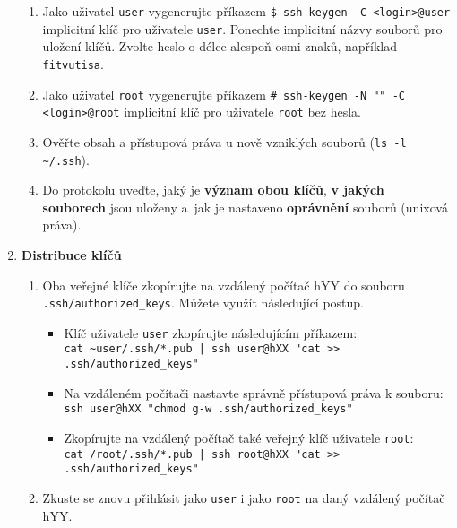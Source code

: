 \documentclass[a4paper,11pt]{article}
\begin{document}
\begin{enumerate}
    \begin{enumerate}

      \item Jako uživatel {\tt user} vygenerujte příkazem \verb|$ ssh-keygen -C <login>@user|
        implicitní klíč pro uživatele
        {\tt user}. Ponechte implicitní názvy souborů pro uložení klíčů. Zvolte heslo o délce alespoň osmi znaků, například \texttt{fitvutisa}.

      \item Jako uživatel {\tt root} vygenerujte příkazem \verb|# ssh-keygen -N "" -C <login>@root|
        implicitní klíč pro uživatele {\tt root} bez hesla.

      \item Ověřte obsah a přístupová práva u nově vzniklých souborů (\verb|ls -l ~/.ssh|).

      \item Do protokolu uveďte, jaký je \textbf{význam obou klíčů}, \textbf{v jakých souborech} jsou uloženy a~jak je nastaveno \textbf{oprávnění} souborů (unixová práva).

    \end{enumerate}

  \item {\bf Distribuce klíčů}

    \begin{enumerate}

      \item Oba veřejné klíče zkopírujte na vzdálený počítač hYY do
        souboru \verb|.ssh/authorized_keys|. Můžete využít následující postup. 
        \begin{itemize}
          \item Klíč uživatele {\tt user} zkopírujte následujícím příkazem: \\
            {\verb&cat ~user/.ssh/*.pub | ssh user@hXX "cat >> .ssh/authorized_keys"&}
          \item Na vzdáleném počítači nastavte správně přístupová práva k souboru:\\
            {\verb&ssh user@hXX "chmod g-w .ssh/authorized_keys"&} 
          \item Zkopírujte na vzdálený počítač také veřejný klíč uživatele {\tt root}: \\
            {\verb&cat /root/.ssh/*.pub | ssh root@hXX "cat >> .ssh/authorized_keys"&}
        \end{itemize}

      \item Zkuste se znovu přihlásit jako \texttt{user} i jako \texttt{root} na daný vzdálený počítač hYY.


\end{enumerate}
\end{enumerate}
\end{document}
